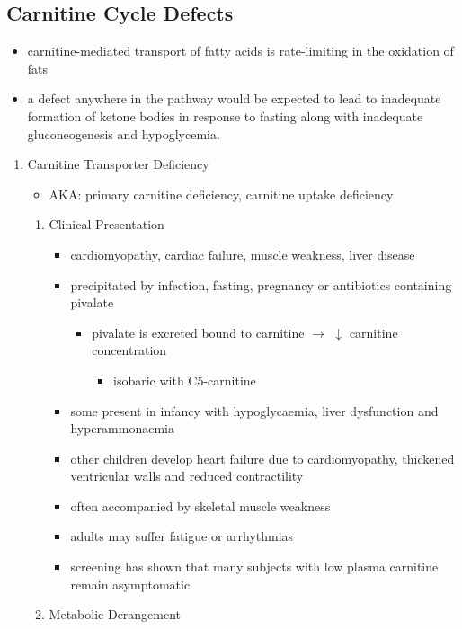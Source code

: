 \documentclass{scrartcl}
\begin{document}
\subsection{Carnitine Cycle Defects}
\label{sec:org1c3a272}
\begin{itemize}
\item carnitine-mediated transport of fatty acids is rate-limiting in the
oxidation of fats
\item a defect anywhere in the pathway would be expected to lead to
inadequate formation of ketone bodies in response to fasting along
with inadequate gluconeogenesis and hypoglycemia.
\end{itemize}
\begin{enumerate}
\item Carnitine Transporter Deficiency
\label{sec:org5eca6a6}
\begin{itemize}
\item AKA: primary carnitine deficiency, carnitine uptake deficiency
\end{itemize}
\begin{enumerate}
\item Clinical Presentation
\label{sec:org32875a4}
\begin{itemize}
\item cardiomyopathy, cardiac failure, muscle weakness, liver disease
\item precipitated by infection, fasting, pregnancy or antibiotics containing pivalate
\begin{itemize}
\item pivalate is excreted bound to carnitine \(\to\) \(\downarrow\) carnitine concentration
\begin{itemize}
\item isobaric with C5-carnitine
\end{itemize}
\end{itemize}
\item some present in infancy with hypoglycaemia, liver dysfunction and hyperammonaemia
\item other children develop heart failure due to cardiomyopathy,
thickened ventricular walls and reduced contractility
\item often accompanied by skeletal muscle weakness
\item adults may suffer fatigue or arrhythmias
\item screening has shown that many subjects with low plasma carnitine remain asymptomatic
\end{itemize}
\item Metabolic Derangement

\end{enumerate}
\end{enumerate}
\end{document}
